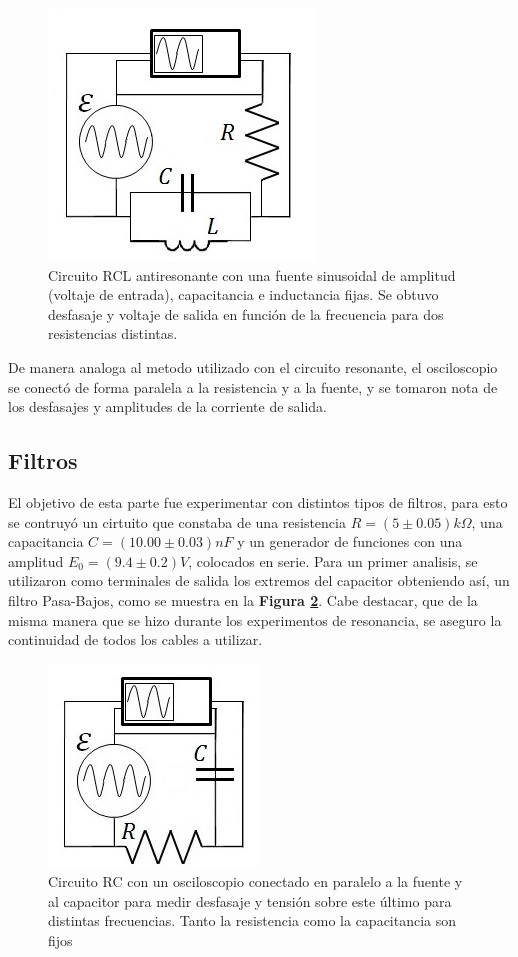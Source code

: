 \documentclass[11pt,a4paper]{article}
\begin{document}
\begin{figure}[h]
\centering
\includegraphics[scale=0.7]{Circuito-RCL-AntiResonante}
  \caption{Circuito RCL antiresonante con una fuente sinusoidal de amplitud (voltaje de entrada), capacitancia e inductancia fijas. Se obtuvo desfasaje y voltaje de salida en función de la frecuencia para dos resistencias distintas.}
  \label{fig:RCL-ARes}
\end{figure}

De manera analoga al metodo utilizado con el circuito resonante, el osciloscopio se conectó de forma paralela a la resistencia y a la fuente, y se tomaron nota de los desfasajes y amplitudes de la corriente de salida.


\subsection{Filtros}

El objetivo de esta parte fue experimentar con distintos tipos de filtros, para esto se contruyó un cirtuito que constaba de una resistencia $R = (5 \pm 0.05)k\Omega$, una capacitancia $C = (10.00 \pm 0.03)nF$ y un generador de funciones con una amplitud $E_{0} = (9.4 \pm 0.2)V$, colocados en serie. Para un primer analisis, se utilizaron como terminales de salida los extremos del capacitor obteniendo así, un filtro Pasa-Bajos, como se muestra en la \textbf{Figura \ref{fig:RC-PB}}. Cabe destacar, que de la misma manera que se hizo durante los experimentos de resonancia, se aseguro la continuidad de todos los cables a utilizar.

\begin{figure}[h]
\centering
\includegraphics[scale=0.9]{Circuito-RC-Pasa-Bajos}
  \caption{Circuito RC con un osciloscopio conectado en paralelo a la fuente y al capacitor para medir desfasaje y tensión sobre este último para distintas frecuencias. Tanto la resistencia como la capacitancia son fijos}
  \label{fig:RC-PB}
\end{figure}
\end{document}
